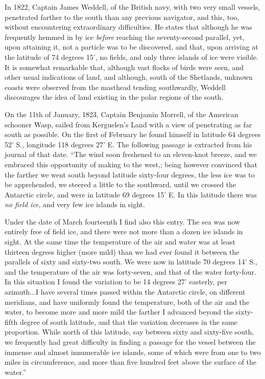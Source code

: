 In 1822, Captain James Weddell, of the British navy, with two very small
vessels, penetrated farther to the south than any previous navigator, and this,
too, without encountering extraordinary difficulties. He states that although he
was frequently hemmed in by ice \emph{before} reaching the seventy-second
parallel, yet, upon attaining it, not a particle was to be discovered, and that,
upon arriving at the latitude of 74 degrees 15', no fields, and only three
islands of ice were visible. It is somewhat remarkable that, although vast
flocks of birds were seen, and other usual indications of land, and although,
south of the Shetlands, unknown coasts were observed from the masthead tending
southwardly, Weddell discourages the idea of land existing in the polar regions
of the south. 

On the 11th of January, 1823, Captain Benjamin Morrell, of the American
schooner Wasp, sailed from Kerguelen's Land with a view of penetrating as far
south as possible. On the first of February he found himself in latitude 64
degrees 52' S., longitude 118 degrees 27' E. The following passage is extracted
from his journal of that date. ``The wind soon freshened to an eleven-knot
breeze, and we embraced this opportunity of making to the west,; being however
convinced that the farther we went south beyond latitude sixty-four degrees, the
less ice was to be apprehended, we steered a little to the southward, until we
crossed the Antarctic circle, and were in latitude 69 degrees 15' E. In this
latitude there was \emph{no field ice}, and very few ice islands in sight. 

Under the date of March fourteenth I find also this entry. The sea was now
entirely free of field ice, and there were not more than a dozen ice islands in
sight. At the same time the temperature of the air and water was at least
thirteen degrees higher (more mild) than we had ever found it between the
parallels of sixty and sixty-two south. We were now in latitude 70 degrees 14'
S., and the temperature of the air was forty-seven, and that of the water
forty-four. In this situation I found the variation to be 14 degrees 27'
easterly, per azimuth...I have several times passed within the Antarctic circle,
on different meridians, and have uniformly found the temperature, both of the
air and the water, to become more and more mild the farther I advanced beyond
the sixty-fifth degree of south latitude, and that the variation decreases in
the same proportion. While north of this latitude, say between sixty and
sixty-five south, we frequently had great difficulty in finding a passage for
the vessel between the immense and almost innumerable ice islands, some of which
were from one to two miles in circumference, and more than five hundred feet
above the surface of the water.'' 

